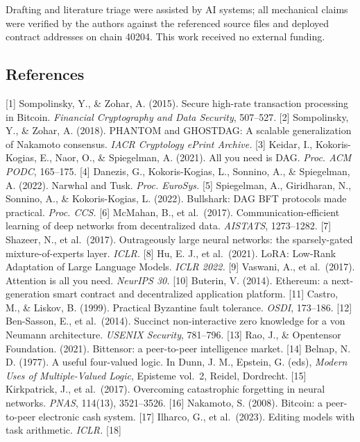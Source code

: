 Drafting and literature triage were assisted by AI systems; all
mechanical claims were verified by the authors against the referenced
source files and deployed contract addresses on chain 40204. This work
received no external funding.

\subsection{References}\label{references}

{[}1{]} Sompolinsky, Y., \& Zohar, A. (2015). Secure high-rate
transaction processing in Bitcoin. \emph{Financial Cryptography and Data
Security}, 507--527. {[}2{]} Sompolinsky, Y., \& Zohar, A. (2018).
PHANTOM and GHOSTDAG: A scalable generalization of Nakamoto consensus.
\emph{IACR Cryptology ePrint Archive.} {[}3{]} Keidar, I.,
Kokoris-Kogias, E., Naor, O., \& Spiegelman, A. (2021). All you need is
DAG. \emph{Proc. ACM PODC}, 165--175. {[}4{]} Danezis, G.,
Kokoris-Kogias, L., Sonnino, A., \& Spiegelman, A. (2022). Narwhal and
Tusk. \emph{Proc. EuroSys.} {[}5{]} Spiegelman, A., Giridharan, N.,
Sonnino, A., \& Kokoris-Kogias, L. (2022). Bullshark: DAG BFT protocols
made practical. \emph{Proc. CCS.} {[}6{]} McMahan, B., et al.~(2017).
Communication-efficient learning of deep networks from decentralized
data. \emph{AISTATS}, 1273--1282. {[}7{]} Shazeer, N., et al.~(2017).
Outrageously large neural networks: the sparsely-gated
mixture-of-experts layer. \emph{ICLR.} {[}8{]} Hu, E. J., et al.~(2021).
LoRA: Low-Rank Adaptation of Large Language Models. \emph{ICLR 2022.}
{[}9{]} Vaswani, A., et al.~(2017). Attention is all you need.
\emph{NeurIPS 30.} {[}10{]} Buterin, V. (2014). Ethereum: a
next-generation smart contract and decentralized application platform.
{[}11{]} Castro, M., \& Liskov, B. (1999). Practical Byzantine fault
tolerance. \emph{OSDI}, 173--186. {[}12{]} Ben-Sasson, E., et
al.~(2014). Succinct non-interactive zero knowledge for a von Neumann
architecture. \emph{USENIX Security}, 781--796. {[}13{]} Rao, J., \&
Opentensor Foundation. (2021). Bittensor: a peer-to-peer intelligence
market. {[}14{]} Belnap, N. D. (1977). A useful four-valued logic. In
Dunn, J. M., Epstein, G. (eds), \emph{Modern Uses of Multiple-Valued
Logic}, Episteme vol.~2, Reidel, Dordrecht. {[}15{]} Kirkpatrick, J., et
al.~(2017). Overcoming catastrophic forgetting in neural networks.
\emph{PNAS}, 114(13), 3521--3526. {[}16{]} Nakamoto, S. (2008). Bitcoin:
a peer-to-peer electronic cash system. {[}17{]} Ilharco, G., et
al.~(2023). Editing models with task arithmetic. \emph{ICLR.} {[}18{]}
